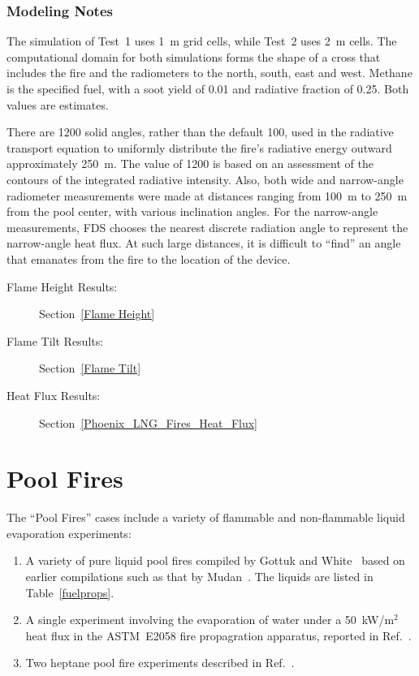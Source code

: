 \subsubsection{Modeling Notes}

The simulation of Test~1 uses 1~m grid cells, while Test~2 uses 2~m cells. The computational domain for both simulations forms the shape of a cross that includes the fire and the radiometers to the north, south, east and west. Methane is the specified fuel, with a soot yield of 0.01 and radiative fraction of 0.25. Both values are estimates. 

There are 1200 solid angles, rather than the default 100, used in the radiative transport equation to uniformly distribute the fire's radiative energy outward approximately 250~m. The value of 1200 is based on an assessment of the contours of the integrated radiative intensity. Also, both wide and narrow-angle radiometer measurements were made at distances ranging from 100~m to 250~m from the pool center, with various inclination angles. For the narrow-angle measurements, FDS chooses the nearest discrete radiation angle to represent the narrow-angle heat flux. At such large distances, it is difficult to ``find'' an angle that emanates from the fire to the location of the device.

\begin{description}
\item[Flame Height Results:] Section~\ref{Flame Height} 
\item[Flame Tilt Results:] Section~\ref{Flame Tilt} 
\item[Heat Flux Results:] Section~\ref{Phoenix_LNG_Fires_Heat_Flux} 
\end{description}

\FloatBarrier

\section{Pool Fires}
\label{Pool_Fires_Description}

The ``Pool Fires'' cases include a variety of flammable and non-flammable liquid evaporation experiments:
\begin{enumerate}
\item A variety of pure liquid pool fires compiled by Gottuk and White~\cite{SFPE:Gottuk_and_White} based on earlier compilations such as that by Mudan~\cite{Mudan:1984}. The liquids are listed in Table~\ref{fuelprops}.
\item A single experiment involving the evaporation of water under a 50~kW/m$^2$ heat flux in the ASTM~E2058 fire propagration apparatus, reported in Ref.~\cite{SFPE:Tewarson}. 
\item Two heptane pool fire experiments described in Ref.~\cite{Sikanen:2016}.
\end{enumerate}

